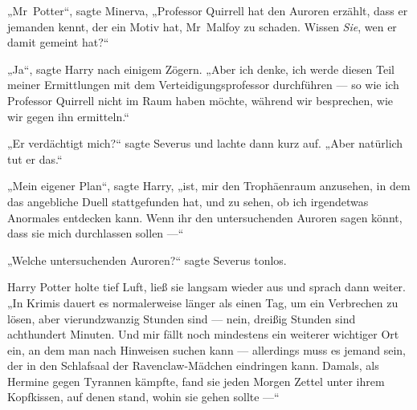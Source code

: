 „Mr~Potter“, sagte Minerva,
„Professor Quirrell hat den Auroren erzählt, dass er jemanden kennt, der ein Motiv hat, Mr~Malfoy zu schaden. Wissen \emph{Sie}, wen er damit gemeint hat?“

„Ja“, sagte Harry nach einigem Zögern.
„Aber ich denke, ich werde diesen Teil meiner Ermittlungen mit dem Verteidigungsprofessor durchführen — so wie ich Professor Quirrell nicht im Raum haben möchte, während wir besprechen, wie wir gegen ihn ermitteln.“

„Er verdächtigt mich?“ sagte Severus und lachte dann kurz auf.
„Aber natürlich tut er das.“

„Mein eigener Plan“, sagte Harry, „ist, mir den Trophäenraum anzusehen, in dem das angebliche Duell stattgefunden hat, und zu sehen, ob ich irgendetwas Anormales entdecken kann. Wenn ihr den untersuchenden Auroren sagen könnt, dass sie mich durchlassen sollen —“

„Welche untersuchenden Auroren?“ sagte Severus tonlos.

Harry Potter holte tief Luft, ließ sie langsam wieder aus und sprach dann weiter.
„In Krimis dauert es normalerweise länger als einen Tag, um ein Verbrechen zu lösen, aber vierundzwanzig Stunden sind — nein, dreißig Stunden sind achthundert Minuten. Und mir fällt noch mindestens ein weiterer wichtiger Ort ein, an dem man nach Hinweisen suchen kann — allerdings muss es jemand sein, der in den Schlafsaal der Ravenclaw-Mädchen eindringen kann. Damals, als Hermine gegen Tyrannen kämpfte, fand sie jeden Morgen Zettel unter ihrem Kopfkissen, auf denen stand, wohin sie gehen sollte —“

